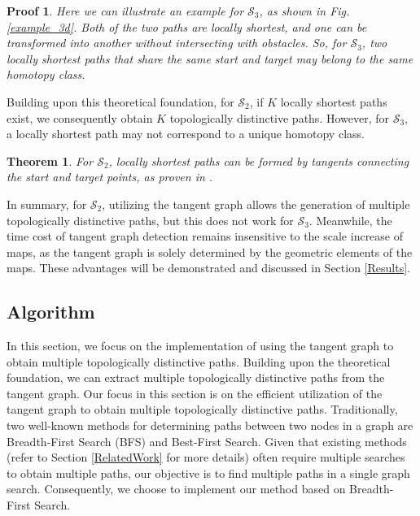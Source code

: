 \documentclass[letterpaper, 10 pt, journal, twoside]{IEEEtran}
\newtheorem{myTheo}{Theorem}
\newtheorem{myProof}{Proof}
\begin{document}
\begin{myProof}
Here we can illustrate an example for $\mathcal{S}_{3}$, as shown in Fig. \ref{example_3d}. Both of the two paths are locally shortest, and one can be transformed into another without intersecting with obstacles. So, for $\mathcal{S}_{3}$, two locally shortest paths that share the same start and target may belong to the same homotopy class.

\end{myProof}

Building upon this theoretical foundation, for $\mathcal{S}_{2}$, if $K$ locally shortest paths exist, we consequently obtain $K$ topologically distinctive paths. However, for $\mathcal{S}_{3}$, a locally shortest path may not correspond to a unique homotopy class.

\begin{myTheo}
For $\mathcal{S}_{2}$, locally shortest paths can be formed by tangents connecting the start and target points, as proven in \cite{8, 17}.
\end{myTheo}

In summary, for $\mathcal{S}_{2}$, utilizing the tangent graph allows the generation of multiple topologically distinctive paths, but this does not work for $\mathcal{S}_{3}$. Meanwhile, the time cost of tangent graph detection remains insensitive to the scale increase of maps, as the tangent graph is solely determined by the geometric elements of the maps. These advantages will be demonstrated and discussed in Section \ref{Results}.


\subsection{Algorithm}

In this section, we focus on the implementation of using the tangent graph to obtain multiple topologically distinctive paths. Building upon the theoretical foundation, we can extract multiple topologically distinctive paths from the tangent graph. Our focus in this section is on the efficient utilization of the tangent graph to obtain multiple topologically distinctive paths. Traditionally, two well-known methods for determining paths between two nodes in a graph are Breadth-First Search (BFS) and Best-First Search. Given that existing methods (refer to Section \ref{RelatedWork} for more details) often require multiple searches to obtain multiple paths, our objective is to find multiple paths in a single graph search. Consequently, we choose to implement our method based on Breadth-First Search.
\end{document}
